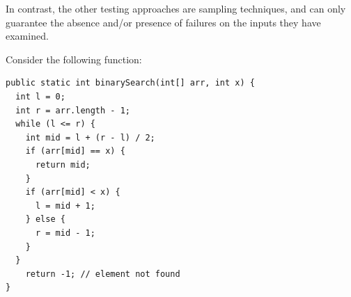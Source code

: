 \documentclass[addpoints, answers]{exam}
\begin{document}
\begin{questions}
\begin{parts}
\begin{solution}
          In contrast, the other testing approaches are sampling
          techniques, and can only guarantee the absence and/or
          presence of failures on the inputs they have examined. %
        \end{solution}

\end{parts}









\newpage

\question Consider the following function:
  \begin{verbatim}
public static int binarySearch(int[] arr, int x) {
  int l = 0;
  int r = arr.length - 1;
  while (l <= r) {
    int mid = l + (r - l) / 2;
    if (arr[mid] == x) {
      return mid;
    }
    if (arr[mid] < x) {
      l = mid + 1;
    } else {
      r = mid - 1;
    }
  }
    return -1; // element not found
}
\end{verbatim}


\end{questions}
\end{document}
